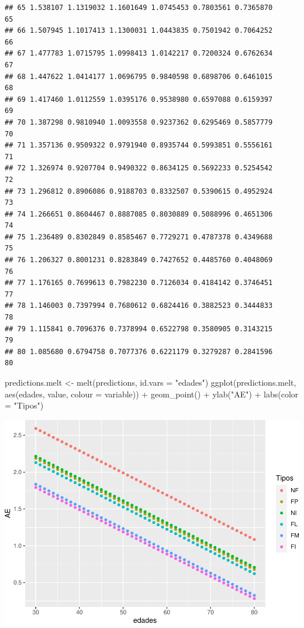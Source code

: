 \documentclass[
]{article}
\newenvironment{Shaded}{\begin{snugshade}}{\end{snugshade}}
\newcommand{\AttributeTok}[1]{\textcolor[rgb]{0.77,0.63,0.00}{#1}}
\newcommand{\FunctionTok}[1]{\textcolor[rgb]{0.00,0.00,0.00}{#1}}
\newcommand{\NormalTok}[1]{#1}
\newcommand{\OtherTok}[1]{\textcolor[rgb]{0.56,0.35,0.01}{#1}}
\newcommand{\SpecialCharTok}[1]{\textcolor[rgb]{0.00,0.00,0.00}{#1}}
\newcommand{\StringTok}[1]{\textcolor[rgb]{0.31,0.60,0.02}{#1}}
\begin{document}
\begin{verbatim}
## 65 1.538107 1.1319032 1.1601649 1.0745453 0.7803561 0.7365870     65
## 66 1.507945 1.1017413 1.1300031 1.0443835 0.7501942 0.7064252     66
## 67 1.477783 1.0715795 1.0998413 1.0142217 0.7200324 0.6762634     67
## 68 1.447622 1.0414177 1.0696795 0.9840598 0.6898706 0.6461015     68
## 69 1.417460 1.0112559 1.0395176 0.9538980 0.6597088 0.6159397     69
## 70 1.387298 0.9810940 1.0093558 0.9237362 0.6295469 0.5857779     70
## 71 1.357136 0.9509322 0.9791940 0.8935744 0.5993851 0.5556161     71
## 72 1.326974 0.9207704 0.9490322 0.8634125 0.5692233 0.5254542     72
## 73 1.296812 0.8906086 0.9188703 0.8332507 0.5390615 0.4952924     73
## 74 1.266651 0.8604467 0.8887085 0.8030889 0.5088996 0.4651306     74
## 75 1.236489 0.8302849 0.8585467 0.7729271 0.4787378 0.4349688     75
## 76 1.206327 0.8001231 0.8283849 0.7427652 0.4485760 0.4048069     76
## 77 1.176165 0.7699613 0.7982230 0.7126034 0.4184142 0.3746451     77
## 78 1.146003 0.7397994 0.7680612 0.6824416 0.3882523 0.3444833     78
## 79 1.115841 0.7096376 0.7378994 0.6522798 0.3580905 0.3143215     79
## 80 1.085680 0.6794758 0.7077376 0.6221179 0.3279287 0.2841596     80
\end{verbatim}

\vspace{0.3cm}

\begin{Shaded}
\begin{Highlighting}[]
\NormalTok{predictions.melt }\OtherTok{\textless{}{-}} \FunctionTok{melt}\NormalTok{(predictions, }\AttributeTok{id.vars =} \StringTok{"edades"}\NormalTok{)}
\FunctionTok{ggplot}\NormalTok{(predictions.melt, }\FunctionTok{aes}\NormalTok{(edades, value, }\AttributeTok{colour =}\NormalTok{ variable)) }\SpecialCharTok{+}
    \FunctionTok{geom\_point}\NormalTok{() }\SpecialCharTok{+} \FunctionTok{ylab}\NormalTok{(}\StringTok{"AE"}\NormalTok{) }\SpecialCharTok{+} \FunctionTok{labs}\NormalTok{(}\AttributeTok{color =} \StringTok{"Tipos"}\NormalTok{)}
\end{Highlighting}
\end{Shaded}

\includegraphics{A4_files/figure-latex/unnamed-chunk-32-1.pdf}
\end{document}
